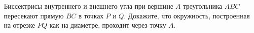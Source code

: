 \begin{ex}
	\begin{condition}
		Биссектрисы внутреннего и внешнего угла при вершине \( A  \) треугольника \( ABC  \) пересекают прямую \( BC  \) в точках \( P  \) и \( Q \). Докажите, что окружность, построенная на отрезке \( PQ \) как на диаметре, проходит через точку \( A \).
	\end{condition}
\end{ex}